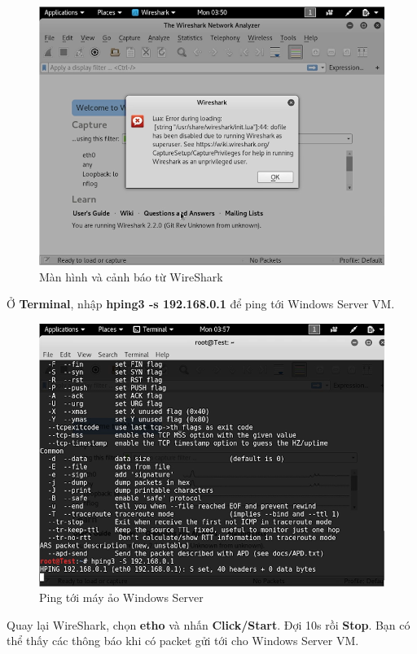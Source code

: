 \begin{figure}[!htb]
    \centering
    \includegraphics[width=0.8\linewidth]{figure//chapter5//lab5_2/wireshark.png}
    \caption{Màn hình và cảnh báo từ WireShark}
    \label{fig:enter-label}
\end{figure}

 Ở \textbf{Terminal}, nhập \textbf{hping3 -s 192.168.0.1} để ping tới Windows Server VM.

\begin{figure}[!htb]
    \centering
    \includegraphics[width=0.8\linewidth]{figure//chapter5//lab5_2/ping_to_windows_server.png}
    \caption{Ping tới máy ảo Windows Server}
    \label{fig:enter-label}
\end{figure}

\newpage

 Quay lại WireShark, chọn \textbf{etho} và nhấn \textbf{Click/Start}. Đợi 10s rồi \textbf{Stop}. Bạn có thể thấy các thông báo khi có packet gửi tới cho Windows Server VM.

